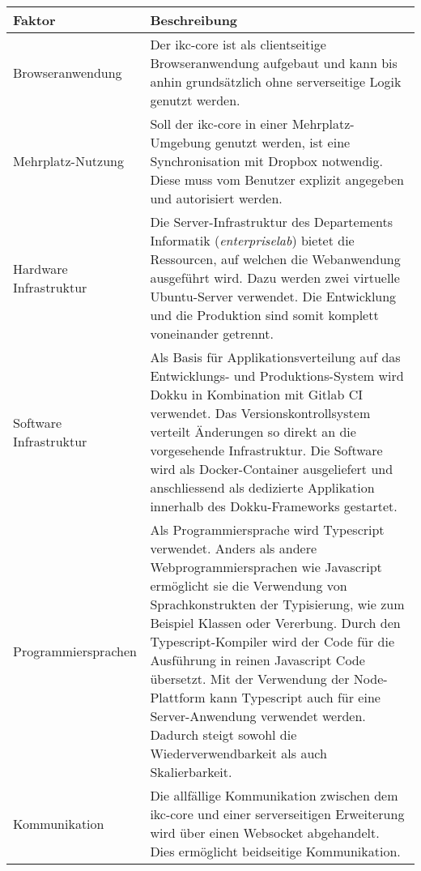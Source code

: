\begin{longtable}{|p{4.2cm}|p{8.5cm}|}

  \hline
    Faktor &  Beschreibung \\\hline
    Browseranwendung & Der \gls{ikc-core} ist als clientseitige Browseranwendung aufgebaut und kann bis anhin grundsätzlich ohne serverseitige Logik genutzt werden. %
    \\\hline
    Mehrplatz-Nutzung & Soll der \gls{ikc-core} in einer Mehrplatz-Umgebung genutzt werden, ist eine Synchronisation mit \gls{Dropbox} notwendig. Diese muss vom Benutzer explizit angegeben und autorisiert werden.\\\hline
    Hardware Infrastruktur & Die Server-Infrastruktur des Departements Informatik (\textit{enterpriselab}) bietet die Ressourcen, auf welchen die Webanwendung ausgeführt wird. Dazu werden zwei virtuelle \gls{Ubuntu}-Server verwendet. Die Entwicklung und die Produktion sind somit komplett voneinander getrennt.\\\hline
    
    Software Infrastruktur & Als Basis für Applikationsverteilung auf das Entwicklungs- und Produktions-System wird \gls{Dokku} in Kombination mit \gls{Gitlab CI} verwendet. Das Versionskontrollsystem verteilt Änderungen so direkt an die vorgesehende Infrastruktur. Die Software wird als \gls{Docker}-Container ausgeliefert und anschliessend als dedizierte Applikation innerhalb des \gls{Dokku}-Frameworks gestartet.\\\hline
    
    Programmiersprachen & Als Programmiersprache wird \gls{Typescript} verwendet. Anders als andere Webprogrammiersprachen wie \gls{Javascript} ermöglicht sie die Verwendung von Sprachkonstrukten der Typisierung, wie zum Beispiel Klassen oder Vererbung. Durch den Typescript-Kompiler wird der Code für die Ausführung in reinen \gls{Javascript} Code übersetzt. Mit der Verwendung der \gls{Node}-Plattform kann \gls{Typescript} auch für eine Server-Anwendung verwendet werden. Dadurch steigt sowohl die Wiederverwendbarkeit als auch Skalierbarkeit.\\\hline
    
    Kommunikation & Die allfällige Kommunikation zwischen dem \gls{ikc-core} und einer serverseitigen Erweiterung wird über einen Websocket abgehandelt. Dies ermöglicht beidseitige Kommunikation. \\\hline
    

\end{longtable}
